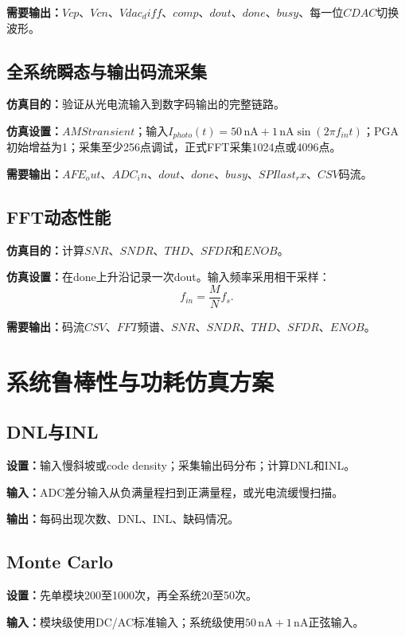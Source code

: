 \documentclass[12pt,a4paper]{ctexart}
\begin{document}
\textbf{需要输出：}$Vcp、Vcn、Vdac_diff、comp、dout、done、busy$、每一位$CDAC$切换波形。

\subsection{全系统瞬态与输出码流采集}

\textbf{仿真目的：}验证从光电流输入到数字码输出的完整链路。

\textbf{仿真设置：}$AMS transient；$输入$I_{photo}(t)=50\,\mathrm{nA}+1\,\mathrm{nA}\sin(2\pi f_{in}t)$；PGA初始增益为1；采集至少256点调试，正式FFT采集1024点或4096点。

\textbf{需要输出：}$AFE_out、ADC_in、dout、done、busy、SPI last_rx、CSV$码流。

\subsection{FFT动态性能}

\textbf{仿真目的：}计算$SNR、SNDR、THD、SFDR$和$ENOB$。

\textbf{仿真设置：}在done上升沿记录一次dout。输入频率采用相干采样：
\begin{equation}
    f_{in}=\frac{M}{N}f_s.
\end{equation}

\textbf{需要输出：}码流$CSV、FFT$频谱、$SNR、SNDR、THD、SFDR、ENOB$。

\section{系统鲁棒性与功耗仿真方案}

\subsection{DNL与INL}

\textbf{设置：}输入慢斜坡或code density；采集输出码分布；计算DNL和INL。

\textbf{输入：}ADC差分输入从负满量程扫到正满量程，或光电流缓慢扫描。

\textbf{输出：}每码出现次数、DNL、INL、缺码情况。

\subsection{Monte Carlo}

\textbf{设置：}先单模块200至1000次，再全系统20至50次。

\textbf{输入：}模块级使用DC/AC标准输入；系统级使用$50\,\mathrm{nA}+1\,\mathrm{nA}$正弦输入。
\end{document}

